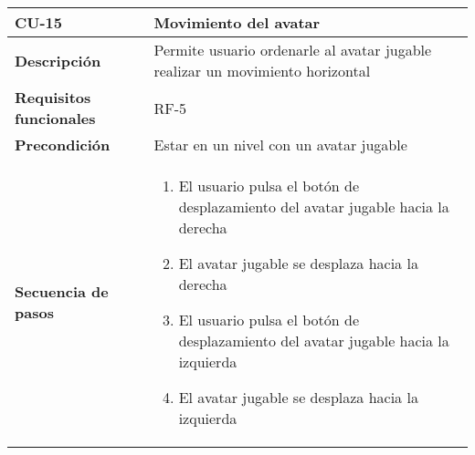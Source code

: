 \begin{tabularx}{\columnwidth}{l|l}
\begin{minipage}{0.25\columnwidth}
\textbf{CU-15} 
\end{minipage}
&
\begin{minipage}{0.65\columnwidth}
Movimiento del avatar
\end{minipage}
\\ \hline

\begin{minipage}{0.25\columnwidth}
\textbf{Descripción} 
\end{minipage}
&
\begin{minipage}{0.65\columnwidth}
Permite usuario ordenarle al avatar jugable realizar un movimiento horizontal
\end{minipage}
\\ \hline

\begin{minipage}{0.25\columnwidth}
\textbf{Requisitos funcionales} 
\end{minipage}
&
\begin{minipage}{0.65\columnwidth}
RF-5
\end{minipage}
\\ \hline

\begin{minipage}{0.25\columnwidth}
\textbf{Precondición} 
\end{minipage}
&
\begin{minipage}{0.65\columnwidth}
Estar en un nivel con un avatar jugable
\end{minipage}
\\ \hline

\begin{minipage}{0.25\columnwidth}
\textbf{Secuencia de pasos} 
\end{minipage}
&
\begin{minipage}{0.65\columnwidth}
\begin{enumerate}
\item
El usuario pulsa el botón de desplazamiento del avatar jugable hacia la derecha
\item
El avatar jugable se desplaza hacia la derecha
\item
El usuario pulsa el botón de desplazamiento del avatar jugable hacia la izquierda
\item
El avatar jugable se desplaza hacia la izquierda
\end{enumerate}
\end{minipage}
\\ \hline


\end{tabularx}
